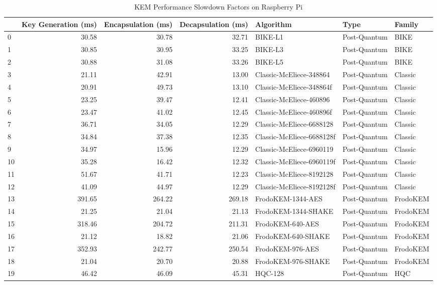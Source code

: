 \begin{table}
\caption{KEM Performance Slowdown Factors on Raspberry Pi}
\label{tab:pi_kem_slowdown}
\begin{tabular}{lrrrlll}
\toprule
 & Key Generation (ms) & Encapsulation (ms) & Decapsulation (ms) & Algorithm & Type & Family \\
\midrule
0 & 30.58 & 30.78 & 32.71 & BIKE-L1 & Post-Quantum & BIKE \\
1 & 30.85 & 30.95 & 33.25 & BIKE-L3 & Post-Quantum & BIKE \\
2 & 30.88 & 31.08 & 33.26 & BIKE-L5 & Post-Quantum & BIKE \\
3 & 21.11 & 42.91 & 13.00 & Classic-McEliece-348864 & Post-Quantum & Classic \\
4 & 20.91 & 49.73 & 13.10 & Classic-McEliece-348864f & Post-Quantum & Classic \\
5 & 23.25 & 39.47 & 12.41 & Classic-McEliece-460896 & Post-Quantum & Classic \\
6 & 23.47 & 41.02 & 12.45 & Classic-McEliece-460896f & Post-Quantum & Classic \\
7 & 36.71 & 34.05 & 12.29 & Classic-McEliece-6688128 & Post-Quantum & Classic \\
8 & 34.84 & 37.38 & 12.35 & Classic-McEliece-6688128f & Post-Quantum & Classic \\
9 & 34.97 & 15.96 & 12.29 & Classic-McEliece-6960119 & Post-Quantum & Classic \\
10 & 35.28 & 16.42 & 12.32 & Classic-McEliece-6960119f & Post-Quantum & Classic \\
11 & 51.67 & 41.71 & 12.23 & Classic-McEliece-8192128 & Post-Quantum & Classic \\
12 & 41.09 & 44.97 & 12.29 & Classic-McEliece-8192128f & Post-Quantum & Classic \\
13 & 391.65 & 264.22 & 269.18 & FrodoKEM-1344-AES & Post-Quantum & FrodoKEM \\
14 & 21.25 & 21.04 & 21.13 & FrodoKEM-1344-SHAKE & Post-Quantum & FrodoKEM \\
15 & 318.46 & 204.72 & 211.31 & FrodoKEM-640-AES & Post-Quantum & FrodoKEM \\
16 & 21.12 & 18.82 & 21.06 & FrodoKEM-640-SHAKE & Post-Quantum & FrodoKEM \\
17 & 352.93 & 242.77 & 250.54 & FrodoKEM-976-AES & Post-Quantum & FrodoKEM \\
18 & 21.04 & 20.70 & 20.88 & FrodoKEM-976-SHAKE & Post-Quantum & FrodoKEM \\
19 & 46.42 & 46.09 & 45.31 & HQC-128 & Post-Quantum & HQC \\

\end{tabular}
\end{table}
